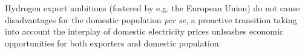 Hydrogen export ambitions (fostered by e.g. the European Union) do not cause disadvantages for the domestic population \textit{per se}, a proactive transition taking into account the interplay of domestic electricity prices unleashes economic opportunities for both exporters and domestic population.









